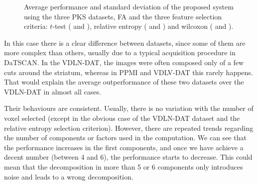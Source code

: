 \begin{figure}
	
	\caption[Average performance of the \acs{PKS} datasets in \acs{FA}.]{Average performance and standard deviation of the proposed system using the three \ac{PKS} datasets, \ac{FA} and the three feature selection criteria: $t$-test (\protect{} and \protect{}), relative entropy (\protect{} and \protect{}) and wilcoxon (\protect{} and \protect{}). } 
	\label{fig:accuracyMeanFA-PKS}
\end{figure}

In this case there is a clear difference between datasets, since some of them are more complex than others, usually due to a typical acquisition procedure in DaTSCAN. In the VDLN-DAT, the images were often composed only of a few cuts around the striatum, whereas in PPMI and VDLV-DAT this rarely happens. That would explain the average outperformance of these two datasets over the VDLN-DAT in almost all cases. 

Their behaviours are consistent. Usually, there is no variation with the number of voxel selected (except in the obvious case of the VDLN-DAT dataset and the relative entropy selection criterion). However, there are repeated trends regarding the number of components or factors used in the computation. We can see that the performance increases in the first components, and once we have achieve a decent number (between 4 and 6), the performance starts to decrease. This could mean that the decomposition in more than 5 or 6 components only introduces noise and leads to a wrong decomposition. 

